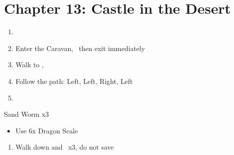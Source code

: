 \chapter{Chapter 13: Castle in the Desert}
\begin{enumerate}
    \item \cs\
    \item Enter the Caravan, \cs\, then exit immediately
    \item Walk to , \cs\
    \item Follow the path: Left, Left, Right, Left
    \item \cs\
\end{enumerate}
\begin{battle}[]{Sand Worm x3}
    \begin{itemize}
        \item Use 6x Dragon Scale
    \end{itemize}
\end{battle}
\begin{enumerate}[resume]
    \item Walk down and \cs\ x3, do not save
\end{enumerate}